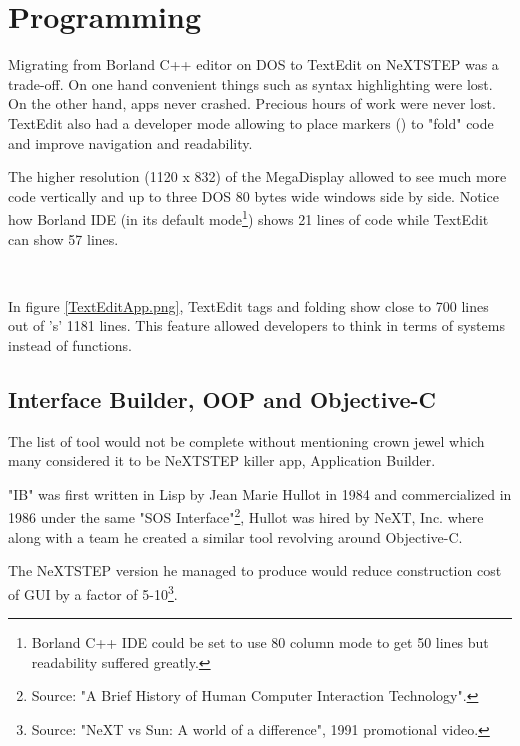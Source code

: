 \vspace{-10pt}
\section{Programming}
Migrating from Borland C++ editor on DOS to TextEdit on NeXTSTEP was a trade-off. On one hand convenient things such as syntax highlighting were lost. On the other hand, apps never crashed. Precious hours of work were never lost. TextEdit also had a developer mode allowing to place markers (\cw{//}) to "fold" code and improve navigation and readability.\\
\par
 The higher resolution (1120 x 832) of the MegaDisplay allowed to see much more code vertically and up to three DOS 80 bytes wide windows side by side. Notice how Borland IDE (in its default mode\footnote{Borland C++ IDE could be set to use 80 column mode to get 50 lines but readability suffered greatly.}) shows 21 lines of code while TextEdit can show 57 lines.\\
\par
{}\\

\vspace{-4mm}


In figure \ref{TextEditApp.png}, TextEdit tags and folding show close to 700 lines out of 's' 1181 lines. This feature allowed developers to think in terms of systems instead of functions.

\subsection{Interface Builder, OOP and Objective-C}
The list of tool would not be complete without mentioning \NeXT crown jewel which many considered it to be NeXTSTEP killer app, Application Builder.\\
\par
"IB" was first written in Lisp by Jean Marie Hullot in 1984 and commercialized in 1986 under the same "SOS Interface"\footnote{Source: "A Brief History of Human Computer Interaction Technology".}, Hullot was hired by NeXT, Inc. where along with a team he created a similar tool revolving around Objective-C.\\
\par
The NeXTSTEP version he managed to produce would reduce construction cost of GUI by a factor of 5-10\footnote{Source: "NeXT vs Sun: A world of a difference", 1991 promotional video.}.\\
\par
{}



